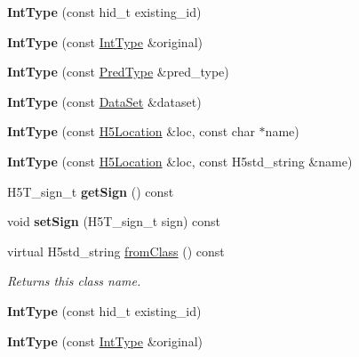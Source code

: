 \begin{DoxyCompactItemize}
{\bfseries Int\+Type} (const hid\+\_\+t existing\+\_\+id)
\item 
\mbox{\label{class_h5_1_1_int_type_a8ecc940c184e86495280787a135e4e14}} 
{\bfseries Int\+Type} (const \hyperlink{class_h5_1_1_int_type}{Int\+Type} \&original)
\item 
\mbox{\label{class_h5_1_1_int_type_ae490ae5914c745c2b37a4909413b8f44}} 
{\bfseries Int\+Type} (const \hyperlink{class_h5_1_1_pred_type}{Pred\+Type} \&pred\+\_\+type)
\item 
\mbox{\label{class_h5_1_1_int_type_aa9d284c2140561b895ee34e5d0fa31fd}} 
{\bfseries Int\+Type} (const \hyperlink{class_h5_1_1_data_set}{Data\+Set} \&dataset)
\item 
\mbox{\label{class_h5_1_1_int_type_a8f436e34f7718a7b05d29f3591d899a8}} 
{\bfseries Int\+Type} (const \hyperlink{class_h5_1_1_h5_location}{H5\+Location} \&loc, const char $\ast$name)
\item 
\mbox{\label{class_h5_1_1_int_type_a621da6b7346da555ba0d00801c833cbb}} 
{\bfseries Int\+Type} (const \hyperlink{class_h5_1_1_h5_location}{H5\+Location} \&loc, const H5std\+\_\+string \&name)
\item 
\mbox{\label{class_h5_1_1_int_type_a3bbae05c5428899c10ae5c32a5ae8c09}} 
H5\+T\+\_\+sign\+\_\+t {\bfseries get\+Sign} () const
\item 
\mbox{\label{class_h5_1_1_int_type_adff7d487f13c90003e702ba1872ac686}} 
void {\bfseries set\+Sign} (H5\+T\+\_\+sign\+\_\+t sign) const
\item 
\mbox{\label{class_h5_1_1_int_type_a8e4d3767868034eeb45d362cd6201adc}} 
virtual H5std\+\_\+string \hyperlink{class_h5_1_1_int_type_a8e4d3767868034eeb45d362cd6201adc}{from\+Class} () const
\begin{DoxyCompactList}\small\item\em Returns this class name. \end{DoxyCompactList}\item 
\mbox{\label{class_h5_1_1_int_type_a9e5ddb1a36be05d38ae6c64a119c6add}} 
{\bfseries Int\+Type} (const hid\+\_\+t existing\+\_\+id)
\item 
\mbox{\label{class_h5_1_1_int_type_a8ecc940c184e86495280787a135e4e14}} 
{\bfseries Int\+Type} (const \hyperlink{class_h5_1_1_int_type}{Int\+Type} \&original)
\end{DoxyCompactItemize}

